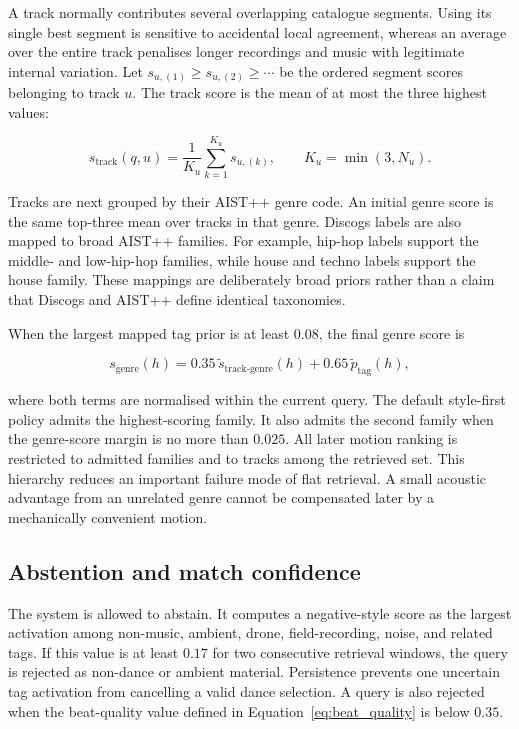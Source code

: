 A track normally contributes several overlapping catalogue segments. Using its
single best segment is sensitive to accidental local agreement, whereas an
average over the entire track penalises longer recordings and music with
legitimate internal variation. Let
$s_{u,(1)}\geq s_{u,(2)}\geq\cdots$ be the ordered segment scores belonging to
track $u$. The track score is the mean of at most the three highest values:

\begin{equation}
    s_{\mathrm{track}}(q,u)
    =\frac{1}{K_u}\sum_{k=1}^{K_u}s_{u,(k)},
    \qquad K_u=\min(3,N_u).
    \label{eq:ch5_track_pooling}
\end{equation}

Tracks are next grouped by their AIST++ genre code. An initial genre score is
the same top-three mean over tracks in that genre. Discogs labels are also
mapped to broad AIST++ families. For example, hip-hop labels support the
middle- and low-hip-hop families, while house and techno labels support the
house family. These mappings are deliberately broad priors rather than a claim
that Discogs and AIST++ define identical taxonomies.

When the largest mapped tag prior is at least $0.08$, the final genre score is

\begin{equation}
    s_{\mathrm{genre}}(h)
    =0.35\,\widetilde{s}_{\mathrm{track\mbox{-}genre}}(h)
     +0.65\,\widetilde{p}_{\mathrm{tag}}(h),
    \label{eq:ch5_genre_prior}
\end{equation}

where both terms are normalised within the current query. The default
style-first policy admits the highest-scoring family. It also admits the second
family when the genre-score margin is no more than $0.025$. All later motion
ranking is restricted to admitted families and to tracks among the retrieved
set. This hierarchy reduces an important failure mode of flat retrieval. A
small acoustic advantage from an unrelated genre cannot be compensated later
by a mechanically convenient motion.

\subsection{Abstention and match confidence}
\label{subsec:ch5_abstention}

The system is allowed to abstain. It computes a negative-style score as the
largest activation among non-music, ambient, drone, field-recording, noise, and
related tags. If this value is at least $0.17$ for two consecutive retrieval
windows, the query is rejected as non-dance or ambient material. Persistence
prevents one uncertain tag activation from cancelling a valid dance selection.
A query is also rejected when the beat-quality value defined in
Equation~\ref{eq:beat_quality} is below $0.35$.

